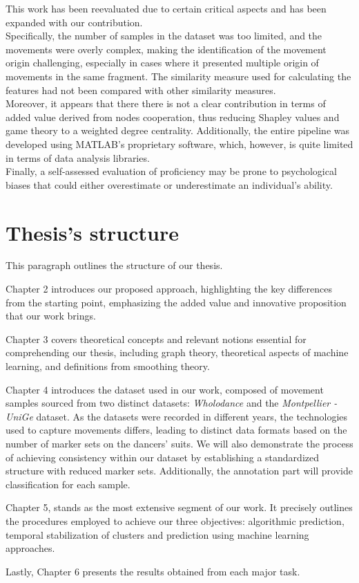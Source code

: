 This work has been reevaluated due to certain critical aspects and has been expanded with our contribution.\\
Specifically, the number of samples in the dataset was too limited, and the movements were overly complex, making the identification of the movement origin challenging, especially in cases where it presented multiple origin of movements in the same fragment.
The similarity measure used for calculating the features had not been compared with other similarity measures. \\
Moreover, it appears that there there is not a clear contribution in terms of added value derived from nodes cooperation, thus reducing Shapley values and game theory to a weighted degree centrality.
Additionally, the entire pipeline was developed using MATLAB's proprietary software, which, however, is quite limited in terms of data analysis libraries.\\
Finally, a self-assessed evaluation of proficiency may be prone to psychological biases that could either overestimate or underestimate an individual's ability.


\section{Thesis's structure}
This paragraph outlines the structure of our thesis. 

Chapter 2 introduces our proposed approach, highlighting the key differences from the starting point, emphasizing the added value and innovative proposition that our work brings. 

Chapter 3 covers theoretical concepts and relevant notions essential for comprehending our thesis, including graph theory, theoretical aspects of machine learning, and definitions from smoothing theory. 

Chapter 4 introduces the dataset used in our work, composed of movement samples sourced from two distinct datasets: \textit{Wholodance} and the \textit{Montpellier - UniGe} dataset.
As the datasets were recorded in different years, the technologies used to capture movements differs, leading to distinct data formats based on the number of marker sets on the dancers' suits.
We will also demonstrate the process of achieving consistency within our dataset by establishing a standardized structure with reduced marker sets.
Additionally, the annotation part will provide classification for each sample. 

Chapter 5, stands as the most extensive segment of our work.
It precisely outlines the procedures employed to achieve our three objectives: algorithmic prediction, temporal stabilization of clusters and prediction using machine learning approaches.

Lastly, Chapter 6 presents the results obtained from each major task.